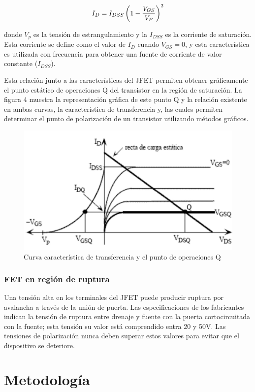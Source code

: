 \documentclass[12pt, a4paper]{article}
\begin{document}
    $$I_D = I_{DSS}\left( 1-{V_{GS} \over V_P}\right) ^2$$

    donde $V_p$ es la tensión de estrangulamiento y la $I_{DSS}$ es la corriente de saturación. Esta corriente se define como el valor de $I_D$ cuando $V_{GS}=0$, y esta característica es utilizada con frecuencia para obtener una fuente de corriente de valor constante ($I_{DSS}$).

    Esta relación junto a las características del JFET permiten obtener gráficamente el punto estático de operaciones Q del transistor en la región de saturación. La figura 4 muestra la representación gráfica de este punto Q y la relación existente en ambas curvas, la característica de transferencia y, las cuales permiten determinar el punto de polarización de un transistor utilizando métodos gráficos.

    \begin{figure}[h!]
        \centering
        \includegraphics[height=5cm\textwidth]{curvafet.jpg}
        \caption{Curva característica de transferencia y el punto de operaciones Q}
        \label{fig:t4}
    \end{figure}

    \subsubsection{FET en región de ruptura}

    Una tensión alta en los terminales del JFET puede producir ruptura por avalancha a través de la unión de puerta. Las especificaciones de los fabricantes indican la tensión de ruptura entre drenaje y fuente con la puerta cortocircuitada con la fuente; esta tensión su valor está comprendido entra 20 y 50V. Las tensiones de polarización nunca deben superar estos valores para evitar que el dispositivo se deteriore.

    \newpage

    \section{Metodología}
\end{document}
